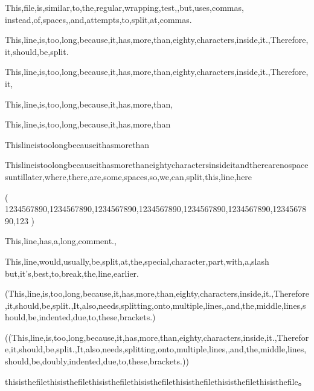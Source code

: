 \documentclass{article}
\begin{document}
This,file,is,similar,to,the,regular,wrapping,test,,but,uses,commas,
instead,of,spaces,,and,attempts,to,split,at,commas.

This,line,is,too,long,because,it,has,more,than,eighty,characters,inside,it.,Therefore,it,should,be,split.

This,line,is,too,long,because,it,has,more,than,eighty,characters,inside,it.,Therefore,it,%

This,line,is,too,long,because,it,has,more,than,%

This,line,is,too,long,because,it,has,more,than%

Thislineistoolongbecauseithasmorethan%

Thislineistoolongbecauseithasmorethaneightycharactersinsideitandtherearenospacesuntillater,where,there,are,some,spaces,so,we,can,split,this,line,here

(
1234567890,1234567890,1234567890,1234567890,1234567890,1234567890,1234567890,123
)

This,line,has,a,long,comment.,%


This,line,would,usually,be,split,at,the,special,character,part,with,a,slash\,but,it's,best,to,break,the,line,earlier.

(This,line,is,too,long,because,it,has,more,than,eighty,characters,inside,it.,Therefore,it,should,be,split.,It,also,needs,splitting,onto,multiple,lines,,and,the,middle,lines,should,be,indented,due,to,these,brackets.)

((This,line,is,too,long,because,it,has,more,than,eighty,characters,inside,it.,Therefore,it,should,be,split.,It,also,needs,splitting,onto,multiple,lines,,and,the,middle,lines,should,be,doubly,indented,due,to,these,brackets.))

thisisthefilethisisthefilethisisthefilethisisthefilethisisthefilethisisthefilethisisthefile。
\end{document}
